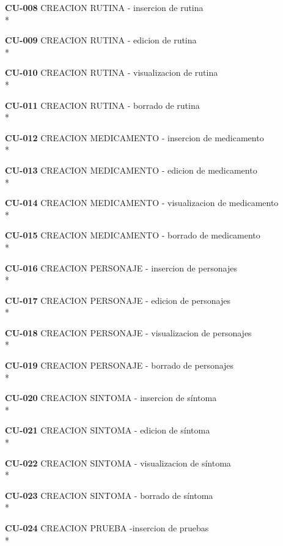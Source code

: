 \documentclass[../pfc.tex]{subfiles}
\begin{document}
	
	
	\textbf{CU-008}	CREACION RUTINA - insercion de rutina\\*
	
	\textbf{CU-009}	CREACION RUTINA - edicion de rutina\\*
	
	\textbf{CU-010}	CREACION RUTINA - visualizacion de rutina\\*
	
	\textbf{CU-011}	CREACION RUTINA - borrado de rutina\\*
	
	
	
	\textbf{CU-012}	CREACION MEDICAMENTO - insercion de medicamento\\*
	
	\textbf{CU-013}	CREACION MEDICAMENTO - edicion de medicamento\\*
	
	\textbf{CU-014}	CREACION MEDICAMENTO - visualizacion de medicamento\\*
	
	\textbf{CU-015}	CREACION MEDICAMENTO - borrado de medicamento\\*
	
	
	
	\textbf{CU-016}	CREACION PERSONAJE - insercion de personajes\\*
	
	\textbf{CU-017}	CREACION PERSONAJE - edicion de personajes\\*
	
	\textbf{CU-018}	CREACION PERSONAJE - visualizacion de personajes\\*
	
	\textbf{CU-019}	CREACION PERSONAJE - borrado de personajes\\*
	
	
	
	\textbf{CU-020}	CREACION SINTOMA - insercion de síntoma\\*
	
	\textbf{CU-021}	CREACION SINTOMA - edicion de síntoma\\*
	
	\textbf{CU-022}	CREACION SINTOMA - visualizacion de síntoma\\*
	
	\textbf{CU-023}	CREACION SINTOMA - borrado de síntoma\\*
	
	
	
	\textbf{CU-024}	CREACION PRUEBA -insercion de pruebas\\*
	
\end{document}
